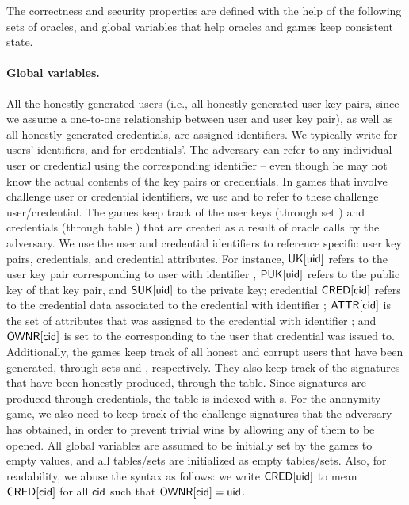 The correctness and security properties are defined with the help of the
following sets of oracles, and global variables that help oracles and games
keep consistent state.

\paragraph{Global variables.} %
All the honestly generated users (i.e., all honestly generated user key pairs,
since we assume a one-to-one relationship between user and user key pair), as
well as all honestly generated credentials, are assigned identifiers. We
typically write \uid for users' identifiers, and \cid for credentials'. The
adversary can
refer to any individual user or credential using the corresponding identifier --
even though he may not know the actual contents of the key pairs or credentials.
In games that involve challenge user or credential identifiers, we use \cuid and
\ccid to refer to these challenge user/credential.
%
The games keep track of the user keys (through set \UK) and credentials (through
table \CRED) that are created as a result of oracle calls by the adversary. We
use the user and credential identifiers to reference specific user key pairs,
credentials, and credential attributes.
For instance, $\mathsf{UK}[\mathsf{uid}]$ refers to the user key pair corresponding to user
with identifier \uid, $\mathsf{P}\mathsf{UK}[\mathsf{uid}]$ refers to the public key of that key pair,
and $\mathsf{S}\mathsf{UK}[\mathsf{uid}]$ to the private key; credential $\mathsf{CRED}[\mathsf{cid}]$ refers to the
credential data associated to the credential with identifier \cid; $\mathsf{ATTR}[\mathsf{cid}]$
is the set of attributes that was assigned to the credential with identifier
\cid; and $\mathsf{OWNR}[\mathsf{cid}]$ is set to the \uid corresponding to the user that
credential \cid was issued to.
%
Additionally, the games keep track of all honest and corrupt users that have
been generated, through sets \HU and \CU, respectively. They also keep track of
the signatures that have been honestly produced, through the \SIG table. Since
signatures are produced through credentials, the \SIG table is indexed with
{\cid}s. For the anonymity game, we also need to keep track of the challenge
signatures that the adversary has obtained, in order to prevent trivial wins
by allowing any of them to be opened. 
%
All global variables are assumed to be initially set by the games to empty
values, and all tables/sets are initialized as empty tables/sets. Also, for
readability, we abuse the syntax as follows: we
write $\mathsf{CRED}[\mathsf{uid}]$ to mean $\mathsf{CRED}[\mathsf{cid}]$ for all $\mathsf{cid}$ such that
$\mathsf{OWNR}[\mathsf{cid}] = \mathsf{uid}$.%


